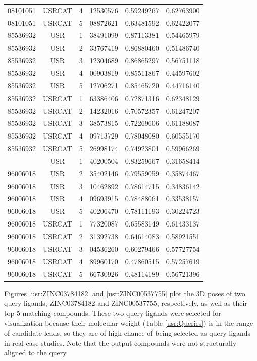 \begin{longtable}{cccccc}
08101051 & USRCAT & 4 & 12530576 & 0.59249267 & 0.62763900\\
08101051 & USRCAT & 5 & 08872621 & 0.63481592 & 0.62422077\\
\hline
85536932 & USR    & 1 & 38491099 & 0.87113381 & 0.54465979\\%
85536932 & USR    & 2 & 33767419 & 0.86880460 & 0.51486740\\
85536932 & USR    & 3 & 12304689 & 0.86865297 & 0.56751118\\
85536932 & USR    & 4 & 00903819 & 0.85511867 & 0.44597602\\
85536932 & USR    & 5 & 12706271 & 0.85465720 & 0.44716140\\
85536932 & USRCAT & 1 & 63386406 & 0.72871316 & 0.62348129\\%
85536932 & USRCAT & 2 & 14232016 & 0.70572357 & 0.61247207\\
85536932 & USRCAT & 3 & 38573815 & 0.72269606 & 0.61188087\\
85536932 & USRCAT & 4 & 09713729 & 0.78048080 & 0.60555170\\
85536932 & USRCAT & 5 & 26998174 & 0.74923801 & 0.59966269\\
\hline
\pagebreak
96006018 & USR    & 1 & 40200504 & 0.83259667 & 0.31658414\\%
96006018 & USR    & 2 & 35402146 & 0.79559059 & 0.35874467\\
96006018 & USR    & 3 & 10462892 & 0.78614715 & 0.34836142\\
96006018 & USR    & 4 & 09693915 & 0.78488061 & 0.33538157\\
96006018 & USR    & 5 & 40206470 & 0.78111193 & 0.30224723\\
96006018 & USRCAT & 1 & 77320087 & 0.65583149 & 0.61433137\\%
96006018 & USRCAT & 2 & 31392738 & 0.64614083 & 0.58921551\\
96006018 & USRCAT & 3 & 04536260 & 0.60279466 & 0.57727754\\
96006018 & USRCAT & 4 & 89960170 & 0.47860515 & 0.57257619\\
96006018 & USRCAT & 5 & 66730926 & 0.48114189 & 0.56721396\\
\hline
\end{longtable}

Figures \ref{usr:ZINC03784182} and \ref{usr:ZINC00537755} plot the 3D poses of two query ligands, ZINC03784182 and ZINC00537755, respectively, as well as their top 5 matching compounds. These two query ligands were selected for visualization because their molecular weight (Table \ref{usr:Queries}) is in the range of candidate leads, so they are of high chance of being selected as query ligands in real case studies. Note that the output compounds were not structurally aligned to the query.

